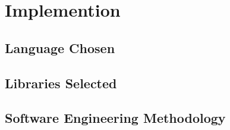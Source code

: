 \chapter{Implemention}

\section{Language Chosen}



\section{Libraries Selected}



\section{Software Engineering Methodology}




